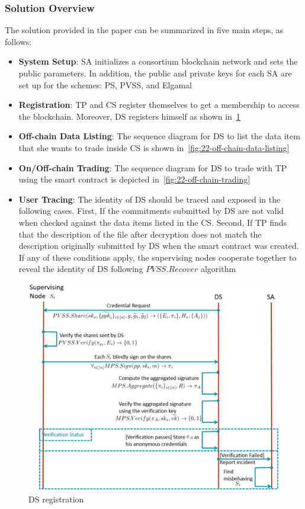 \subsubsection{Solution Overview}
The solution provided in the paper can be summarized in five main steps, as follows:

\begin{itemize}
    \item \textbf{System Setup}: SA initializes a consortium blockchain network and sets the public parameters. In addition, the public and private keys for each SA are set up for the schemes: PS, PVSS, and Elgamal
    \item \textbf{Registration}: TP and CS register themselves to get a membership to access the blockchain.
    Moreover, DS registers himself as shown in~\cref{fig:22-ds-registration}
    \item \textbf{Off-chain Data Listing}: The sequence diagram for DS to list the data item that she wants to trade inside CS is shown in~\cref{fig:22-off-chain-data-listing}
    \item \textbf{On/Off-chain Trading}: The sequence diagram for DS to trade with TP using the smart contract is depicted in~\cref{fig:22-off-chain-trading}
    \item \textbf{User Tracing}: The identity of DS should be traced and exposed in the following cases.
    First, If the commitments submitted by DS are not valid when checked against the data items listed in the CS.
    Second, If TP finds that the description of the file after decryption does not match the description originally submitted by DS when the smart contract was created.
    If any of these conditions apply, the supervising nodes cooperate together to reveal the identity of DS following $PVSS.Recover$ algorithm
\end{itemize}

\begin{figure}
\centering
  \includegraphics[width=1\linewidth]{imgs/22-sequenceRegisterDs.eps}
  \caption{DS registration}
  \label{fig:22-ds-registration}
\end{figure}

